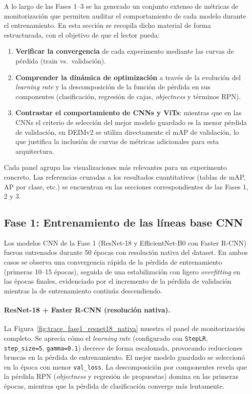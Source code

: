 A lo largo de las Fases 1--3 se ha generado un conjunto extenso de métricas de monitorización que permiten auditar el comportamiento de cada modelo durante el entrenamiento. En esta sección se recopila dicho material de forma estructurada, con el objetivo de que el lector pueda:

\begin{enumerate}
    \item \textbf{Verificar la convergencia} de cada experimento mediante las curvas de pérdida (train vs.\ validación).
    \item \textbf{Comprender la dinámica de optimización} a través de la evolución del \textit{learning rate} y la descomposición de la función de pérdida en sus componentes (clasificación, regresión de cajas, \textit{objectness} y términos RPN).
    \item \textbf{Contrastar el comportamiento de CNNs y ViTs}: mientras que en las CNNs el criterio de selección del mejor modelo guardado es la menor pérdida de validación, en DEIMv2 se utiliza directamente el mAP de validación, lo que justifica la inclusión de curvas de métricas adicionales para esta arquitectura.
\end{enumerate}

Cada panel agrupa las visualizaciones más relevantes para un experimento concreto. Las referencias cruzadas a los resultados cuantitativos (tablas de mAP, AP por clase, etc.) se encuentran en las secciones correspondientes de las Fases 1, 2 y 3.

\subsection{Fase 1: Entrenamiento de las líneas base CNN}
\label{subsec:evidencia_fase1}

Los modelos CNN de la Fase 1 (ResNet-18 y EfficientNet-B0 con Faster R-CNN) fueron entrenados durante 50 épocas con resolución nativa del dataset. En ambos casos se observa una convergencia rápida de la pérdida de entrenamiento (primeras 10--15 épocas), seguida de una estabilización con ligero \textit{overfitting} en las épocas finales, evidenciado por el incremento de la pérdida de validación mientras la de entrenamiento continúa descendiendo.

\paragraph{ResNet-18 + Faster R-CNN (resolución nativa).}
La Figura~\ref{fig:trace_fase1_resnet18_nativa} muestra el panel de monitorización completo. Se aprecia cómo el \textit{learning rate} (configurado con \texttt{StepLR}, \texttt{step\_size=5}, \texttt{gamma=0.1}) decrece de forma escalonada, provocando reducciones bruscas en la pérdida de entrenamiento. El mejor modelo guardado se seleccionó en la época con menor \texttt{val\_loss}. La descomposición por componentes revela que la pérdida RPN (\textit{objectness} y regresión de propuestas) domina en las primeras épocas, mientras que la pérdida de clasificación converge más lentamente.

